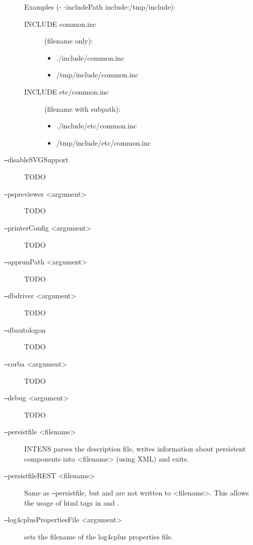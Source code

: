 \begin{description}
  Examples (- -includePath include:/tmp/include): \\
  \begin{description}
  \item[INCLUDE common.inc] (filename only):
  \begin{itemize}
  \item ./include/common.inc
  \item /tmp/include/common.inc
  \end{itemize}
  \item[INCLUDE etc/common.inc] (filename with subpath):
  \begin{itemize}
  \item ./include/etc/common.inc
  \item /tmp/include/etc/common.inc
  \end{itemize}
  \end{description}
%
\item[\texttt{--}disableSVGSupport]
  TODO
%
\item[\texttt{--}pspreviewer <argument>]
  TODO
%
\item[\texttt{--}printerConfig <argument>]
  TODO
%
%
%
%
%
%
\item[\texttt{--}apprunPath <argument>]
  TODO
%
\item[\texttt{--}dbdriver <argument>]
  TODO
%
\item[\texttt{--}dbautologon]
  TODO
%
\item[\texttt{--}corba <argument>]
  TODO
%
\item[\texttt{--}debug <argument>]
  TODO
%
\item[\texttt{--}persistfile <filename>]
  INTENS parses the description file, writes information about persistent components
  into <filename> (using XML) and exits.
%
\item[\texttt{--}persistfileREST <filename>]
  Same as \texttt{--}persistfile, but \LABEL{} and \HELPTEXT{} are not written
  to <filename>. This allows the usage of html tags in \LABEL{} and \HELPTEXT{}.
%
\item[\texttt{--}log4cplusPropertiesFile <argument>] sets the filename of the log4cplus properties file.

\end{description}
